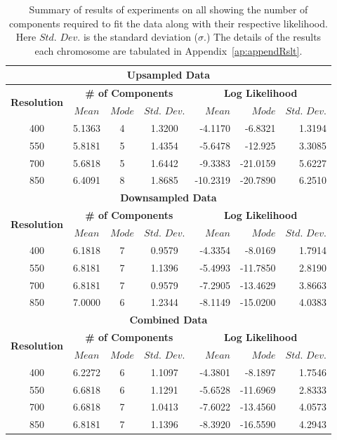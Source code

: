 \begin{table}[h!]
  \centering
\begin{tabular}{|c|c|c|c|r|r|r|}\hline
\multicolumn{7}{|c|}{\textbf{Upsampled Data}} \\ \hline
\multirow{2}{*}{\textbf{Resolution}} & \multicolumn{3}{|c|}{\textbf{\# of Components}} &  \multicolumn{3}{|c|}{\textbf{Log Likelihood}} \\ \cline{2-7}
    & $Mean$ & $Mode$ & $Std.$ $Dev.$  & $Mean$ & $Mode$ & $Std.$ $Dev.$   \\ \hline
400 & 5.1363 & 4 & 1.3200 & -4.1170 & -6.8321 & 1.3194  \\ \hline
550 & 5.8181 & 5 & 1.4354 & -5.6478 & -12.925 & 3.3085  \\ \hline
700 & 5.6818 & 5 & 1.6442 & -9.3383 & -21.0159 &  5.6227  \\ \hline
850 & 6.4091 & 8 & 1.8685 & -10.2319 & -20.7890 &  6.2510  \\ \hline
\multicolumn{7}{|c|}{\textbf{Downsampled Data}} \\ \hline
\multirow{2}{*}{\textbf{Resolution}} & \multicolumn{3}{|c|}{\textbf{\# of Components}} &  \multicolumn{3}{|c|}{\textbf{Log Likelihood}} \\ \cline{2-7}
    & $Mean$ & $Mode$ & $Std.$ $Dev.$  & $Mean$ & $Mode$ & $Std.$ $Dev.$   \\ \hline
400 & 6.1818 & 7 & 0.9579 & -4.3354 & -8.0169  &  1.7914  \\ \hline
550 & 6.8181 & 7 & 1.1396 & -5.4993 & -11.7850 &  2.8190  \\ \hline
700 & 6.8181 & 7 & 0.9579 & -7.2905 & -13.4629 &  3.8663  \\ \hline
850 & 7.0000 & 6 & 1.2344 & -8.1149 & -15.0200 &  4.0383 \\ \hline
\multicolumn{7}{|c|}{\textbf{Combined Data}} \\ \hline
\multirow{2}{*}{\textbf{Resolution}} & \multicolumn{3}{|c|}{\textbf{\# of Components}} &  \multicolumn{3}{|c|}{\textbf{Log Likelihood}} \\ \cline{2-7}
    & $Mean$ & $Mode$ & $Std.$ $Dev.$  & $Mean$ & $Mode$ & $Std.$ $Dev.$   \\ \hline
400 & 6.2272 & 6 & 1.1097 & -4.3801 & -8.1897  & 1.7546  \\ \hline
550 & 6.6818 & 6 & 1.1291 & -5.6528 & -11.6969 & 2.8333  \\ \hline
700 & 6.6818 & 7 & 1.0413 & -7.6022 & -13.4560 & 4.0573  \\ \hline
850 & 6.8181 & 7 & 1.1396 & -8.3920 & -16.5590 & 4.2943  \\ \hline
\end{tabular}
\caption[Summary of Results on all chromosomes]{ Summary of results of experiments on all showing the number of components required to fit the data along with their respective likelihood. Here $Std.$ $Dev.$ is the standard deviation ($\sigma$.) The details of the results each chromosome are tabulated in Appendix~\ref{ap:appendRslt}.} \label{Tab:finalresults}
\end{table}

